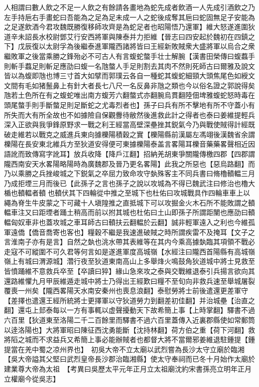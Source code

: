 人相謂曰數人飲之不足一人飲之有餘請各畫地為蛇先成者飲酒一人先成引酒飲之乃左手持巵右手畫蛇曰吾能為之足為足未成一人之蛇後成奪其巵曰蛇固無足子安能為之足遂飲酒今君攻魏既勝復移師攻齊是為蛇足者也昭陽悟乃還軍】維大怒遂進圍狄道辛未詔長水校尉鄧艾行安西將軍與陳泰并力拒維【晉志曰四安起於魏初在四鎮之下】戊辰復以太尉孚為後繼泰進軍隴西諸將皆曰王經新敗賊衆大盛將軍以烏合之衆繼敗軍之後當乘勝之鋒殆必不可古人有言蝮蛇螫手壮士解腕【漢書田榮傳曰蝮蠚手則斬手蠚足則斬足應劭曰蝮一名虺螫人手足則割去其肉不然則死師古曰爾雅及說文皆以為蝮即虺也博三寸首大如擘而郭璞云各自一種蛇其蝮蛇細頸大頭焦尾色如綬文文間有毛如猪鬛鼻上有針大者長七八尺一名反鼻非虺之類也今以俗名證之郭說得矣虺若土色所在有之蝮蛇唯出南方蝮芳六翻螫式亦翻腕烏貫翻陸佃埤雅蝮蛇怒時毒在頭尾螫手則手斷螫足則足斷蛇之尤毒烈者也】孫子曰兵有所不擊地有所不守蓋小有所失而大有所全故也不如據險自保觀釁待敝然後進救此計之得者也泰曰姜維提輕兵深入正欲與我爭鋒原野求一戰之利王經當高壁深壘挫其鋭氣今乃與戰使賊得計經既破走維若以戰克之威進兵東向據櫟陽積穀之實【櫟陽縣前漢屬左馮翊後漢魏省余謂櫟陽在長安東北維兵方至狄道安得便可東據櫟陽泰盖言畧陽耳櫟音藥藥畧聲相近因語訛而致傳寫字訛耳】放兵收降【降戶江翻】招納羌胡東爭關隴傳檄四郡【四郡謂隴西南安天水畧陽略陽時為廣魏郡及晉乃更名畧陽】此我之所惡也【惡烏路翻】而乃以乘勝之兵挫峻城之下鋭氣之卒屈力致命攻守埶殊客主不同兵書曰脩櫓轒輼三月乃成拒堙三月而後已【此孫子之言也孫子之說以攻城為不得已魏武注曰修治也櫓大楯也轒輼者轒也轒伏其下四輪從中推之至城下也杜佑曰攻城戰具作四輪車車上以繩為脊生牛皮蒙之下可藏十人塡隍推之直抵城下可以攻掘金火木石所不能敗謂之轒輼車注又曰距堙者踊土稍高而前以拊其城也杜佑曰土山即孫子所謂距闉也應劭曰轒輼匈奴車非也蓋攻城之車耳師古曰轒扶云翻輼於云翻】誠非輕軍遠入之利也今維孤軍遠僑【僑音喬寄也客也】糧穀不繼是我速進破賊之時所謂疾雷不及掩耳【文子之言淮南子亦有是言】自然之埶也洮水帶其表維等在其内今乘高據埶臨其項領不戰必走寇不可縱圍不可久君等何言如是遂進軍度高城嶺【水經注曰隴西首陽縣有高城嶺嶺上有城曰渭源城】濳行夜至狄道東南高山上多舉烽火鳴鼓角狄道城中將士見救至皆憤踊維不意救兵卒至【卒讀曰猝】緣山急來攻之泰與交戰維退泰引兵揚言欲向其還路維懼九月甲辰維遁走城中將士乃得出王經歎曰糧不至旬向非救兵速至舉城屠裂覆喪一州矣【隴西畧陽天水南安秦州也喪息浪翻】泰慰勞將士前後遣還更差軍守【差擇也遣還王經所統將士更擇軍以守狄道勞力到翻差初佳翻】并治城壘【治直之翻】還屯上邽泰每以一方有事輒以虚聲擾動天下故希簡上事【上時掌翻】驛書不過六百里【狄道東至洛陽二千二百餘里而驛書不過六百里蓋傳入近裏郡縣使如常郵筒以逹洛陽也】大將軍昭曰陳征西沈勇能斷【沈持林翻】荷方伯之重【荷下河翻】救將䧟之城而不求益兵又希簡上事必能辦賊者也都督大將不當爾邪姜維退駐鍾提【鍾提當在羌中蜀之凉州界也】　初吳大帝不立太廟以武烈嘗為長沙太守立廟於臨湘【吳大帝謚其父堅曰武烈皇帝長沙郡治臨湘縣】使太守奉祠而已冬十月始作太廟於建業尊大帝為太祖　【考異曰吳歷太平元年正月立太祖廟沈約宋書孫亮立明年正月立權廟今從吳志】

